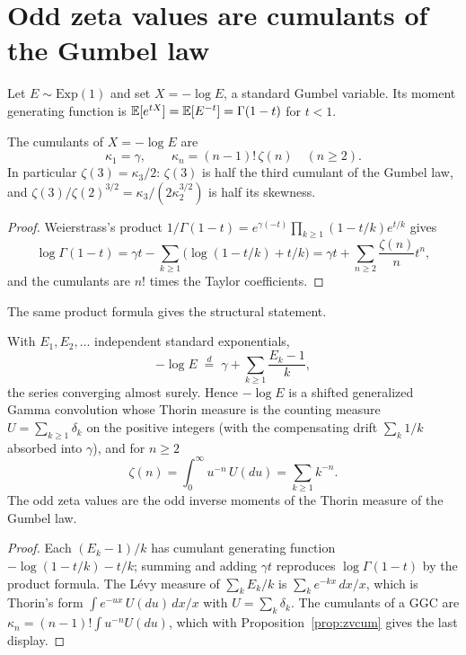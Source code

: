 \section{Odd zeta values are cumulants of the Gumbel law}

Let $E\sim\mathrm{Exp}(1)$ and set $X=-\log E$, a standard Gumbel variable. Its moment generating function is $\mathbb{E}[e^{tX}]=\mathbb{E}[E^{-t}]=\Gamma(1-t)$ for $t<1$.

\begin{proposition}[cumulants]\label{prop:zvcum}
The cumulants of $X=-\log E$ are
\[
\kappa_1=\gamma,\qquad \kappa_n=(n-1)!\,\zeta(n)\quad(n\ge 2).
\]
In particular $\zeta(3)=\kappa_3/2$: $\zeta(3)$ is half the third cumulant of the Gumbel law, and $\zeta(3)/\zeta(2)^{3/2}=\kappa_3/(2\kappa_2^{3/2})$ is half its skewness.
\end{proposition}

\begin{proof}
Weierstrass's product $1/\Gamma(1-t)=e^{\gamma(-t)}\prod_{k\ge1}(1-t/k)e^{t/k}$ gives
\[
\log\Gamma(1-t)=\gamma t-\sum_{k\ge1}\Big(\log(1-t/k)+t/k\Big)=\gamma t+\sum_{n\ge2}\frac{\zeta(n)}{n}t^n ,
\]
and the cumulants are $n!$ times the Taylor coefficients.
\end{proof}

The same product formula gives the structural statement.

\begin{theorem}\label{thm:zvgumbel}
With $E_1,E_2,\dots$ independent standard exponentials,
\[
-\log E\;\overset{d}{=}\;\gamma+\sum_{k\ge1}\frac{E_k-1}{k},
\]
the series converging almost surely. Hence $-\log E$ is a shifted generalized Gamma convolution whose Thorin measure is the counting measure $U=\sum_{k\ge1}\delta_k$ on the positive integers (with the compensating drift $\sum_k 1/k$ absorbed into $\gamma$), and for $n\ge2$
\[
\zeta(n)=\int_0^\infty u^{-n}\,U(du)=\sum_{k\ge1}k^{-n}.
\]
The odd zeta values are the odd inverse moments of the Thorin measure of the Gumbel law.
\end{theorem}

\begin{proof}
Each $(E_k-1)/k$ has cumulant generating function $-\log(1-t/k)-t/k$; summing and adding $\gamma t$ reproduces $\log\Gamma(1-t)$ by the product formula. The L\'evy measure of $\sum_k E_k/k$ is $\sum_k e^{-kx}\,dx/x$, which is Thorin's form $\int e^{-ux}\,U(du)\,dx/x$ with $U=\sum_k\delta_k$. The cumulants of a GGC are $\kappa_n=(n-1)!\int u^{-n}U(du)$, which with Proposition~\ref{prop:zvcum} gives the last display.
\end{proof}

